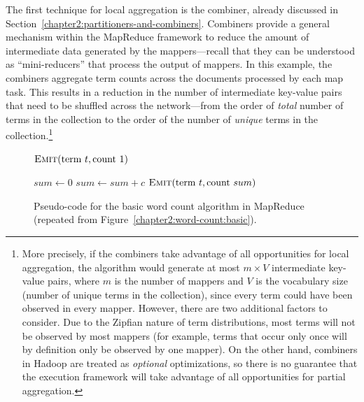The first technique for local aggregation is the combiner, already
discussed in Section~\ref{chapter2:partitioners-and-combiners}.
Combiners provide a general mechanism within the MapReduce framework
to reduce the amount of intermediate data generated by the
mappers---recall that they can be understood as ``mini-reducers'' that
process the output of mappers.  In this example, the combiners
aggregate term counts across the documents processed by each map task.
This results in a reduction in the number of intermediate key-value
pairs that need to be shuffled across the network---from the order of
{\it total} number of terms in the collection to the order of the
number of {\it unique} terms in the collection.\footnote{More
  precisely, if the combiners take advantage of all opportunities for
  local aggregation, the algorithm would generate at most $m \times V$
  intermediate key-value pairs, where $m$ is the number of mappers and
  $V$ is the vocabulary size (number of unique terms in the
  collection), since every term could have been observed in every
  mapper.  However, there are two additional factors to consider.  Due
  to the Zipfian nature of term distributions, most terms will not be
  observed by most mappers (for example, terms that occur only once
  will by definition only be observed by one mapper).  On the other
  hand, combiners in Hadoop are treated as {\it optional}
  optimizations, so there is no guarantee that the execution framework
  will take advantage of all opportunities for partial aggregation.}

\begin{figure}[t]
\algrenewcommand{}
\algrenewcommand{}
  \begin{algorithmic}[1]
    \State $\textsc{Emit}(\textrm{term }t, \textrm{count }1)$
    \EndFor
    \EndProcedure
    \EndFunction
  \end{algorithmic}

  \begin{algorithmic}[1]
    \State $sum \gets 0$
    \State $sum \gets sum + c$
    \EndFor
    \State $\textsc{Emit}(\textrm{term }t, \textrm{count }sum)$
    \EndProcedure
    \EndFunction
  \end{algorithmic}
  \caption{Pseudo-code for the basic word count algorithm in MapReduce
    (repeated from Figure~\ref{chapter2:word-count:basic}).}
\label{figure:chapter3:word-count:basic}
\end{figure}

